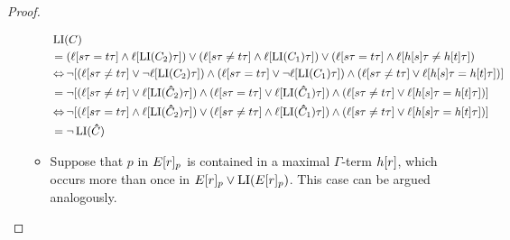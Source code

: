 \documentclass[,%
	draft=false,%
	numbers=noendperiod
	11pt,
	a4paper,
	oneside,%
	openany,
]{memoir}
\begin{document}
\begin{proof}
\begin{itemize}
\begin{itemize}
					\hspace*{\dimexpr-\leftmargini-\leftmarginii-\leftmarginiii}\parbox{\linewidth}{%
						\begin{align*}
							&\operatorname{LI}(C) \\
						 &= (\ell[s\tau=t\tau] \land \ell[\operatorname{LI}(C_2)\tau] ) \lor (\ell[s\tau\neq t\tau] \land \ell[\operatorname{LI}(C_1)\tau]) \lor (\ell[s\tau=t\tau] \land \ell[h[s]\tau \neq h[t]\tau]) \\
						 &\operatorname{\Leftrightarrow} \lnot [ (\ell[s\tau\neq t\tau] \lor \lnot \ell[\operatorname{LI}(C_2)\tau] ) \land (\ell[s\tau= t\tau] \lor \lnot\ell[\operatorname{LI}(C_1)\tau]) \land (\ell[s\tau\neq t\tau] \lor \ell[h[s]\tau = h[t]\tau]) ] \\
						 &= \lnot [ (\ell[s\tau\neq t\tau] \lor \ell[\operatorname{LI}(\bm\hat C_2)\tau] ) \land (\ell[s\tau= t\tau] \lor \ell[\operatorname{LI}(\bm\hat C_1)\tau]) \land (\ell[s\tau\neq t\tau] \lor \ell[h[s]\tau = h[t]\tau]) ] \\
						 &\operatorname{\Leftrightarrow} \lnot [ (\ell[s\tau= t\tau] \land \ell[\operatorname{LI}(\bm\hat C_2)\tau] ) \lor (\ell[s\tau\neq t\tau] \land \ell[\operatorname{LI}(\bm\hat C_1)\tau]) \land (\ell[s\tau\neq t\tau] \lor \ell[h[s]\tau = h[t]\tau]) ]\\
						 &= \lnot \operatorname{LI}(\bm\hat C)
						\end{align*}
					}\par

				\item Suppose that $p$ in $E{[r]_{p}}$ is contained in a maximal $\Gamma$-term $h[r]$, which occurs more than once in $E{[r]_{p}} \lor \operatorname{LI}(E{[r]_{p}})$. 
					This case can be argued analogously.


\end{itemize}
\end{itemize}
\end{proof}
\end{document}
